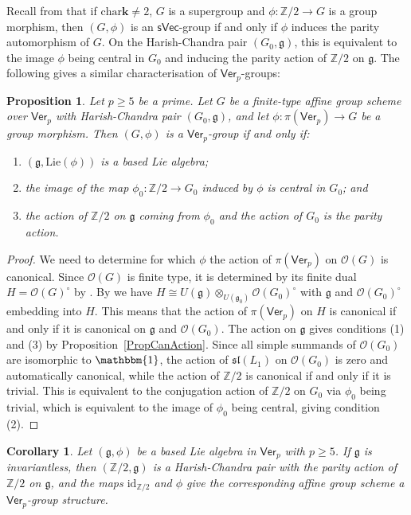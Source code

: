 \documentclass[11pt,a4paper,reqno]{amsart}
\newtheorem{prop}[theorem]{Proposition}
\newtheorem{corollary}[subsection]{Corollary}
\theoremstyle{definition}
\newcommand{\bk}{\mathbf{k}}
\numberwithin{equation}{section}
\newcommand{\charr}{\mathrm{char}}
\newcommand{\Ver}{\mathsf{Ver}}
\newcommand{\unit}{{\mathbbm{1}}}
\newcommand{\cO}{\mathcal{O}}
\newcommand{\mZ}{\mathbb{Z}}
\newcommand{\fg}{\mathfrak{g}}
\newcommand{\fsl}{\mathfrak{sl}}
\newcommand{\Lie}{\mathrm{Lie}}
\newcommand{\id}{\mathrm{id}}
\newcommand{\sVec}{\mathsf{sVec}}
\begin{document}
Recall from \cite{De} that if $\charr\bk\neq2$, $G$ is a supergroup and $\phi:\mZ/2\to G$ is a group morphism, then $(G,\phi)$ is an $\sVec$-group if and only if $\phi$ induces the parity automorphism of $G$. On the Harish-Chandra pair $(G_0,\fg)$, this is equivalent to the image $\phi$ being central in $G_0$ and inducing the parity action of $\mZ/2$ on $\fg$. The following gives a similar characterisation of $\Ver_p$-groups:

\begin{prop}\label{PropBased}
Let $p\geq5$ be a prime. Let $G$ be a finite-type affine group scheme over $\Ver_p$ with Harish-Chandra pair $(G_0,\fg)$, and let $\phi:\pi(\Ver_p)\to G$ be a group morphism. Then $(G,\phi)$ is a $\Ver_p$-group if and only if:
\begin{enumerate}
\item $(\fg,\Lie(\phi))$ is a based Lie algebra;
\item the image of the map $\phi_0:\mZ/2\to G_0$ induced by $\phi$ is central in $G_0$; and
\item the action of $\mZ/2$ on $\fg$ coming from $\phi_0$ and the action of $G_0$ is the parity action.
\end{enumerate}
\end{prop}

\begin{proof}
We need to determine for which $\phi$ the action of $\pi(\Ver_p)$ on $\cO(G)$ is canonical. Since $\cO(G)$ is finite type, it is determined by its finite dual $H=\cO(G)^\circ$ by \cite[Proposition~4.33]{Ve1}. By \cite[Lemma~6.6]{Ve1} we have $H\cong U(\fg)\otimes_{U(\fg_0)}\cO(G_0)^\circ$ with $\fg$ and $\cO(G_0)^\circ$ embedding into $H$. This means that the action of $\pi(\Ver_p)$ on $H$ is canonical if and only if it is canonical on $\fg$ and $\cO(G_0)$. The action on $\fg$ gives conditions (1) and (3) by Proposition~\ref{PropCanAction}. Since all simple summands of $\cO(G_0)$ are isomorphic to $\unit$, the action of $\fsl(L_1)$ on $\cO(G_0)$ is zero and automatically canonical, while the action of $\mZ/2$ is canonical if and only if it is trivial. This is equivalent to the conjugation action of $\mZ/2$ on $G_0$ via $\phi_0$ being trivial, which is equivalent to the image of $\phi_0$ being central, giving condition (2).
\end{proof}

\begin{corollary}\label{CorBased}
Let $(\fg,\phi)$ be a based Lie algebra in $\Ver_p$ with $p\geq5$. If $\fg$ is invariantless, then $(\mZ/2,\fg)$ is a Harish-Chandra pair with the parity action of $\mZ/2$ on $\fg$, and the maps $\id_{\mZ/2}$ and $\phi$ give the corresponding affine group scheme a $\Ver_p$-group structure.
\end{corollary}
\end{document}
